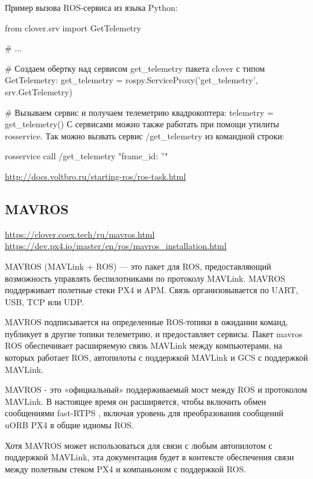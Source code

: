 \begin{Program}[H]
	\caption{Пример вызова ROS-сервиса из языка Python:} \label{lst:1}
	\begin{MyCode}
from clover.srv import GetTelemetry

# ...

# Создаем обертку над сервисом get_telemetry пакета clover с типом GetTelemetry:
get_telemetry = rospy.ServiceProxy('get_telemetry', srv.GetTelemetry)

# Вызываем сервис и получаем телеметрию квадрокоптера:
telemetry = get_telemetry()
С сервисами можно также работать при помощи утилиты rosservice. Так можно вызвать сервис /get_telemetry из командной строки:

rosservice call /get_telemetry "{frame_id: ''}"
	\end{MyCode}
\end{Program}

\url{http://docs.voltbro.ru/starting-ros/ros-task.html}

\subsection{MAVROS}
\url{https://clover.coex.tech/ru/mavros.html}
\url{https://dev.px4.io/master/en/ros/mavros_installation.html}

MAVROS (MAVLink + ROS) — это пакет для ROS, предоставляющий возможность управлять беспилотниками по протоколу MAVLink. MAVROS поддерживает полетные стеки PX4 и APM. Связь организовывается по UART, USB, TCP или UDP.

MAVROS подписывается на определенные ROS-топики в ожидании команд, публикует в другие топики телеметрию, и предоставляет сервисы.
Пакет mavros ROS обеспечивает расширяемую связь MAVLink между компьютерами, на которых работает ROS, автопилоты с поддержкой MAVLink и GCS с поддержкой MAVLink.

MAVROS - это «официальный» поддерживаемый мост между ROS и протоколом MAVLink. В настоящее время он расширяется, чтобы включить обмен сообщениями fast-RTPS , включая уровень для преобразования сообщений uORB PX4 в общие идиомы ROS.

Хотя MAVROS может использоваться для связи с любым автопилотом с поддержкой MAVLink, эта документация будет в контексте обеспечения связи между полетным стеком PX4 и компаньоном с поддержкой ROS.
